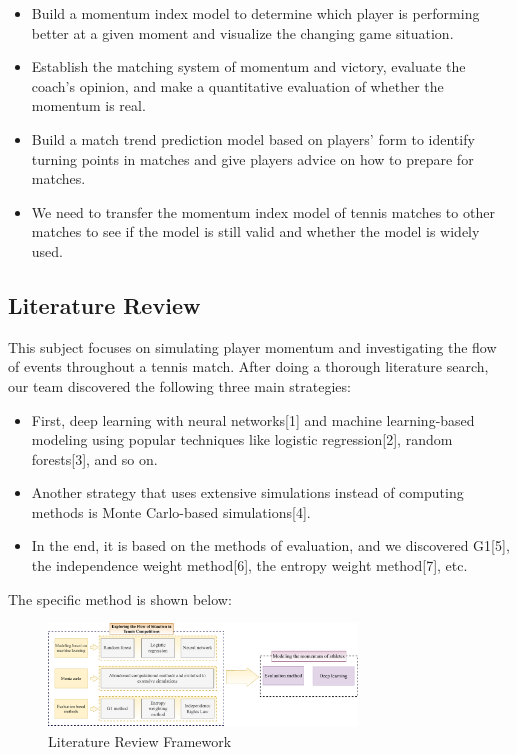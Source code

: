 \documentclass[12pt]{article}  %
\begin{document}
\begin{itemize}
    \item Build a momentum index model to determine which player is performing better at a given moment and visualize the changing game situation.
    \item Establish the matching system of momentum and victory, evaluate the coach's opinion, and make a quantitative evaluation of whether the momentum is real.
    \item Build a match trend prediction model based on players' form to identify turning points in matches and give players advice on how to prepare for matches.
    \item We need to transfer the momentum index model of tennis matches to other matches to see if the model is still valid and whether the model is widely used.
\end{itemize}

\subsection{Literature Review}

This subject focuses on simulating player momentum and investigating the flow of events throughout a tennis match. After doing a thorough literature search, our team discovered the following three main strategies:

\begin{itemize}
    \item First, deep learning with neural networks[1] and machine learning-based modeling using popular techniques like logistic regression[2], random forests[3], and so on.
    \item Another strategy that uses extensive simulations instead of computing methods is Monte Carlo-based simulations[4].
    \item In the end, it is based on the methods of evaluation, and we discovered G1[5], the independence weight method[6], the entropy weight method[7], etc.
\end{itemize}

The specific method is shown below:

\begin{figure}[h] %
	\centering %
	\includegraphics[width=0.73\textwidth]{picture/文献综述.pdf} %
	\caption{Literature Review Framework} %
	\label{} %
\end{figure}
\FloatBarrier
\end{document}
